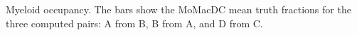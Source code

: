 Myeloid occupancy. The bars show the MoMacDC mean truth fractions for the three computed pairs: A from B, B from A, and D from C.
